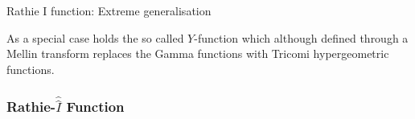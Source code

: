 \documentclass[journal=jcisd8,manuscript=article,layout=onecolumn,pdftex,floatfix,amsmath,amssymb,10pt]{achemso}
\begin{document}
Rathie I function: Extreme generalisation \cite{On the Distribution of the Product and the Sum of Generalized
Shifted Gamma Random Variables}


As a special case holds the so called $Y$-function which although defined through a Mellin transform replaces the Gamma functions with Tricomi hypergeometric functions.

\subsubsection{Rathie-$\hat{\hat{I}}$ Function}
\end{document}
